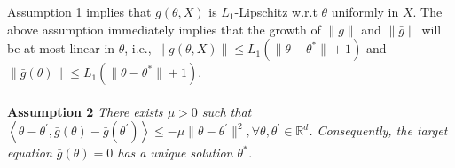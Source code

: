 \documentclass[a4paper]{article}
\newcommand{\norm}[1]{\|#1 \|}
\newcommand{\thetastar}{\theta^*}
\begin{document}
	Assumption 1 implies that $g\left(\theta, X\right)$ is $L_{1}$-Lipschitz w.r.t $\theta$ uniformly in $X$. The above assumption immediately implies that the growth of $\norm{g}$ and $\norm{\bar{g}}$ will be at most linear in $\theta$, i.e., $\norm{g\left(\theta, X\right)} \le L_{1}\left(\norm{\theta - \thetastar} + 1\right)$ and $\norm{\bar{g}\left(\theta\right)} \le L_{1}\left(\norm{\theta - \thetastar} + 1\right)$. 
	\\
	\\
	\textbf{Assumption 2} \textit{
		There exists $\mu > 0$ such that $\left\langle \theta - \theta^{\prime}, \bar{g}(\theta) - \bar{g}(\theta^{\prime}) \right\rangle \le -\mu\norm{\theta - \theta^{\prime}}^{2}, \forall \theta, \theta^{\prime} \in \mathbb{R}^{d}$. Consequently, the target equation $\bar{g}(\theta) = 0$ has a unique solution $\thetastar$.
	}
	\\
	
\end{document}
